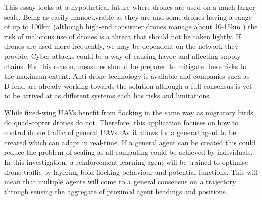 This essay looks at a hypothetical future where drones are used on a much larger scale. Being as easily manoeuvrable as they are and some drones having a range of up to 100km \cite{far1} (although high-end consumer drones manage about 10-15km \cite{far2}) the risk of malicious use of drones is a threat that should not be taken lightly.\cite{ter1} If drones are used more frequently, we may be dependent on the network they provide. Cyber-attacks could be a way of causing havoc and affecting supply chains. For this reason, measures should be prepared to mitigate these risks to the maximum extent. Anti-drone technology is available\cite{ter2} and companies such as D-fend \cite{ter3} are already working towards the solution although a full consensus is yet to be arrived at as different systems each has risks and limitations\cite{ter4}.

While fixed-wing UAVs benefit from flocking in the same way as migratory birds do quad-copter drones do not. Therefore, this application focuses on how to control drone traffic of general UAVs. As it allows for a general agent to be created which can adapt in real-time. If a general agent can be created this could reduce the problem of scaling as all computing could be achieved by individuals.
In this investigation, a reinforcement learning agent will be trained to optimise drone traffic by layering boid flocking behaviour and potential functions. This will mean that multiple agents will come to a general consensus on a trajectory through sensing the aggregate of proximal agent headings and positions.
\clearpage